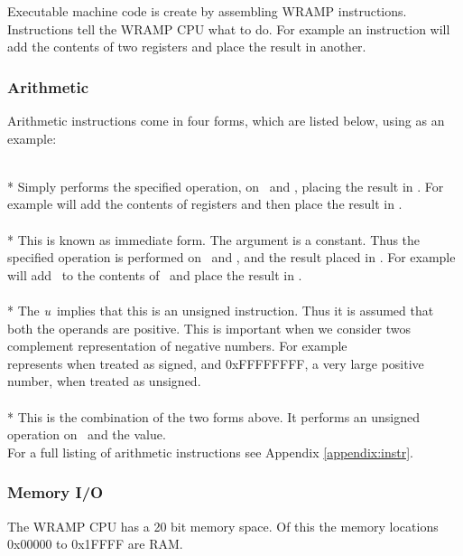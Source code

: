 Executable machine code is create by assembling WRAMP instructions.
Instructions tell the WRAMP CPU what to do.  For example an  
instruction will add the contents of two registers and place the result 
in another.

\subsubsection{Arithmetic}
Arithmetic instructions come in four forms, which are listed 
below, using  as an example:


 \\*
  Simply performs the specified operation,
  on \regs\ and \regt, placing the result in \regd.  For example 
  \mbox{} will add the contents of registers
   and  then place the result in .
  \\

 \\* 
  This is known as immediate form.
  The argument  is a constant.  Thus the specified
  operation is performed on \regs\ and , and the result
  placed in \regd.  For example \mbox{} will add
  \ to the contents of \ and place the result in
  .  
  \\

 \\* 
  The \emph{u}\ implies that this is
  an unsigned instruction.  Thus it is assumed that both the operands
  are positive.  This is important when we consider twos complement
  representation of negative numbers.  For example \\ \mbox{} represents  when
  treated as signed, and 0xFFFFFFFF, a very large positive number,
  when treated as unsigned.  \\

 \\*
  This is the combination of the two forms above.  It performs an unsigned
  operation on \regs\ and the  value.
  \\

For a full listing of arithmetic instructions see  Appendix 
\ref{appendix:instr}.


\subsubsection{Memory I/O}
The WRAMP CPU has a 20 bit memory space.  Of this the memory locations 
0x00000 to 0x1FFFF are RAM.

